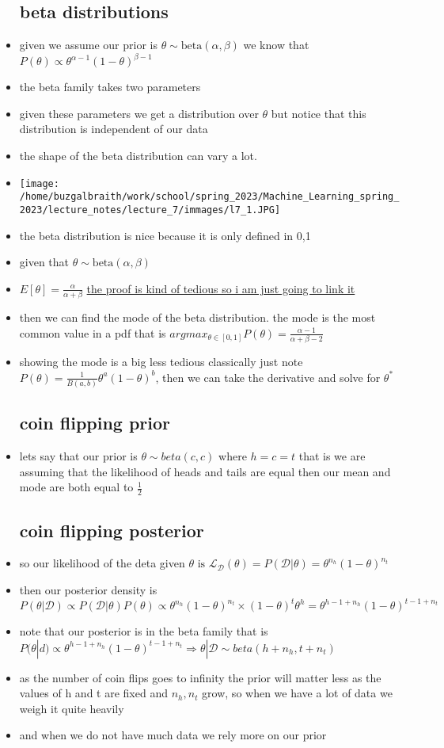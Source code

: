 \documentclass{article}
\begin{document}
\begin{itemize}
\subsection*{beta distributions}
\item given we assume our prior is $\theta\sim \text{beta}(\alpha, \beta)$ we know that $P(\theta)\propto \theta^{\alpha-1}(1-\theta)^{\beta -1}$
\item the beta family takes two parameters 
\item given these parameters we get a distribution over $\theta$ but notice that this distribution is independent of our data 
\item the shape of the beta distribution can vary a lot. 
\item \texttt{[image: /home/buzgalbraith/work/school/spring\_2023/Machine\_Learning\_spring\_2023/lecture\_notes/lecture\_7/immages/l7\_1.JPG]}
\item the beta distribution is nice because it is only defined in 0,1
\item given that $\theta\sim \text{beta}(\alpha, \beta)$
\item $E[\theta]=\frac{\alpha}{\alpha+\beta}$ \href{https://statproofbook.github.io/P/beta-mean.html}{the proof is kind of tedious so i am just going to link it }
\item then we can find the mode of the beta distribution. the mode is the most common value in a pdf that is $argmax_{\theta\in [0,1]}P(\theta)=\frac{\alpha-1}{\alpha+\beta-2}$ 
\item showing the mode is a big less tedious classically just note $P(\theta)=\frac{1}{B(a,b)}\theta^{a}(1-\theta)^b$, then we can take the derivative and solve for $\theta^{*}$
\subsection*{coin flipping prior}
\item lets say that our prior is $\theta\sim beta(c,c)$ where $h=c=t$ that is we are assuming that the likelihood of heads and tails are equal then our mean and mode are both equal to $\frac{1}{2}$
\subsection*{coin flipping posterior}
\item so our likelihood of the deta given  $\theta \text{ is } \mathcal{L}_{\mathcal{D}}(\theta)=P(\mathcal{D}|\theta)=\theta^{n_h}(1-\theta)^{n_t}$
\item then our posterior density is $$P(\theta|\mathcal{D})\propto P(\mathcal{D}|\theta)P(\theta)\propto \theta^{n_h}(1-\theta)^{n_t}\times(1-\theta)^{t}\theta^{h}=\theta^{h-1+n_h}(1-\theta)^{t-1+n_t}$$
\item note that our posterior is in the beta family that is $P(\theta|d)\propto \theta^{h-1+n_h}(1-\theta)^{t-1+n_t}\Rightarrow \theta|\mathcal{D}\sim beta(h+n_h, t+n_t)$
\item as the number of coin flips goes to infinity the prior will matter less as the values of h and t are fixed and $n_h,n_t$ grow, so when we have a lot of data we weigh it quite heavily
\item and when we do not have much data we rely more on our prior

\end{itemize}
\end{document}
